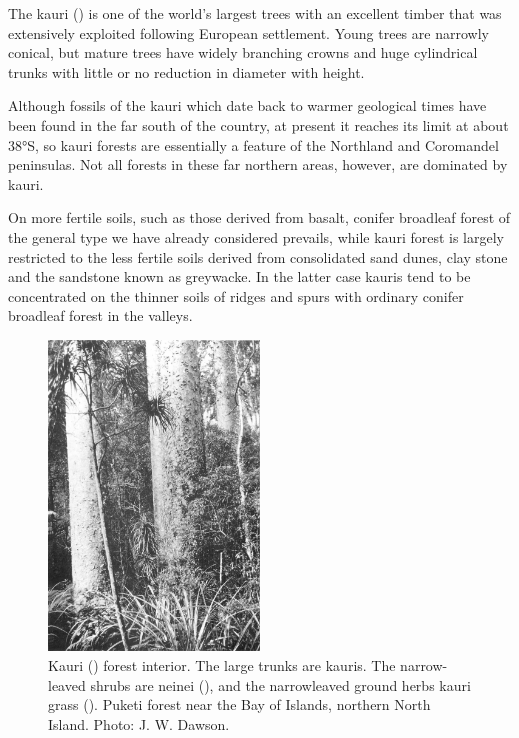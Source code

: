 The kauri () is one of the world's largest trees with an excellent timber that was extensively exploited following European settlement.
Young trees are narrowly conical, but mature trees have widely branching crowns and huge cylindrical trunks with little or no reduction in diameter with height.

Although fossils of the kauri which date back to warmer geological times have been found in the far south of the country, at present it reaches its limit at about 38°S, so kauri forests are essentially a feature of the Northland and Coromandel peninsulas.
Not all forests in these far northern areas, however, are dominated by kauri.

On more fertile soils, such as those derived from basalt, conifer broadleaf forest of the general type we have already considered prevails, while kauri forest is largely restricted to the less fertile soils derived from consolidated sand dunes, clay stone and the sandstone known as greywacke.
In the latter case kauris tend to be concentrated on the thinner soils of ridges and spurs with ordinary conifer broadleaf forest in the valleys.

\begin{figure}
	\includegraphics[width=0.5\textwidth]{graphics/figure65kauri.jpg}
	\centering
	\caption[Kauri forest interior]{Kauri () forest interior.
    The large trunks are kauris.
    The narrow-leaved shrubs are neinei (), and the narrowleaved ground herbs kauri grass ().
    Puketi forest near the Bay of Islands, northern North Island.
    Photo:  J. W. Dawson.}
	\label{fig:65kauri}
\end{figure}

